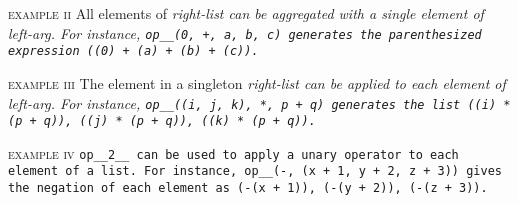 \textsc{example ii}\indent
All elements of \it{right-list} can be
aggregated with a single element of \it{left-arg}.
For instance, \tt{op__(0, +, a, b, c)} generates the
parenthesized expression \tt{((0) + (a) + (b) + (c))}.

\textsc{example iii}\indent
The element in a singleton \it{right-list} can
be applied to each element of \it{left-arg}.
For instance, \tt{op__((i, j, k), *, p + q)} generates the
list \tt{((i) * (p + q)), ((j) * (p + q)), ((k) * (p + q))}.

\textsc{example iv}\indent
\tt{op__2__} can be used to apply a unary operator to each element of a list.
For instance, \tt{op__(-, (x + 1, y + 2, z + 3))} gives the
negation of each element as \tt{(-(x + 1)), (-(y + 2)), (-(z + 3))}.
